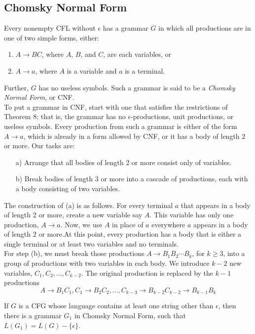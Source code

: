 \documentclass[]{article}
\begin{document}
  \subsection*{Chomsky Normal Form}
    Every nonempty CFL without $\epsilon$ has a grammar $G$ in which all
    productions are in one of two simple forms, either:
      \begin{enumerate}
        \item $A \rightarrow BC$, where $A$, $B$, and $C$, are each variables,
        or
        \item $A \rightarrow a$, where $A$ is a variable and $a$ is a terminal.
      \end{enumerate}
    Further, $G$ has no useless symbols. Such a grammar is said to be a
    \emph{Chomsky Normal Form}, or CNF. \\
    \indent To put a grammar in CNF, start with one that satisfies the
    restrictions of Theorem 8; that is, the grammar has no
    $\epsilon$-productions, unit productions, or useless symbols. Every
    production from such a grammar is either of the form $A \rightarrow a$,
    which is already in a form allowed by CNF, or it has a body of length 2 or
    more. Our tasks are:
      \begin{enumerate}
        \item[a)] Arrange that all bodies of length 2 or more consist only of
        variables.
        \item[b)] Break bodies of length 3 or more into a cascade of
        productions, each with a body consisting of two variables.
      \end{enumerate}
    The construction of (a) is as follows. For every terminal $a$ that appears
    in a body of length 2 or more, create a new variable say $A$. This variable
    has only one production, $A \rightarrow a$. Now, we use $A$ in place of $a$
    everywhere $a$ appears in a body of length 2 or more.At this point, every
    production has a body that is either a single terminal or at least two
    variables and no terminals. \\
    \indent For step (b), we must break those productions
    $A \rightarrow B_1B_2\cdots{}B_k$, for $k \geq 3$, into a group of
    productions with two variables in each body. We introduce $k - 2$ new
    variables, $C_1,C_2,\ldots{},C_{k-2}$. The original production is replaced
    by the $k - 1$ productions
      \[
        A \rightarrow B_1C_1, C_1    \rightarrow B_2C_2,\ldots,C_{k-3}
          \rightarrow B_{k-2}C_{k-2} \rightarrow B_{k-1}B_k
      \]
      \begin{thm}
        If $G$ is a CFG whose language contains at least one string other than
        $\epsilon$, then there is a grammar $G_1$ in Chomsky Normal Form, such
        that $L(G_1) = L(G) - \{\epsilon\}$.
      \end{thm}
\end{document}
